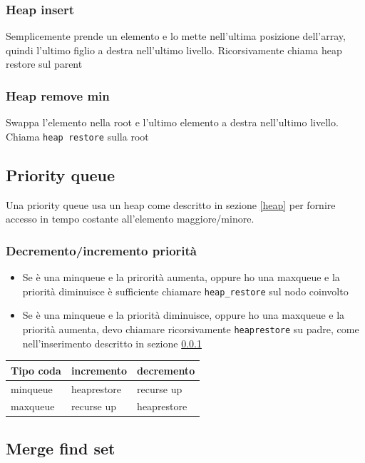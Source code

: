 \subsubsection{Heap insert}\label{heap insert}
Semplicemente prende un elemento e lo mette nell'ultima posizione dell'array, quindi l'ultimo figlio a destra nell'ultimo livello. Ricorsivamente chiama heap restore sul parent
\subsubsection{Heap remove min}
Swappa l'elemento nella root e l'ultimo elemento a destra nell'ultimo livello. Chiama \verb|heap restore| sulla root

\subsection{Priority queue}
Una priority queue usa un heap come descritto in sezione \ref{heap} per fornire accesso in tempo costante all'elemento maggiore/minore.

\subsubsection{Decremento/incremento priorità}
\begin{itemize}
	\item Se è una minqueue e la prirorità aumenta, oppure ho una maxqueue e la priorità diminuisce è sufficiente chiamare \verb|heap_restore| sul nodo coinvolto
	\item Se è una minqueue e la priorità diminuisce, oppure ho una maxqueue e la priorità aumenta, devo chiamare ricorsivamente \verb|heaprestore| su padre, come nell'inserimento descritto in sezione \ref{heap insert}
\end{itemize}
\begin{center}
	\begin{tabular}{l l l}
		\toprule
		Tipo coda & incremento  & decremento  \\
		\midrule
		minqueue  & heaprestore & recurse up  \\
		maxqueue  & recurse up  & heaprestore \\
		\bottomrule
	\end{tabular}
\end{center}

\subsection{Merge find set}
